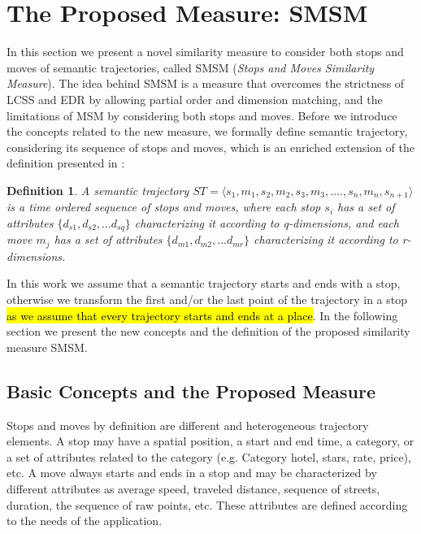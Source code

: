 \documentclass[12pt]{article}
\newtheorem{definition}{Definition}
\begin{document}


\section{The Proposed Measure: SMSM} \label{sec:proposed_measure}
In this section we present a novel similarity measure to consider both stops and moves of semantic trajectories, called SMSM (\textit{Stops and Moves Similarity Measure}). The idea behind SMSM is a measure that overcomes the strictness of LCSS and EDR by allowing partial order and dimension matching, and the limitations of MSM by considering both stops and moves. Before we introduce the concepts related to the new measure, we formally define semantic trajectory, considering its sequence of stops and moves, which is an enriched extension of the definition presented in \cite{Spaccapietra:2008:CVT:1347466.1347785}:


\begin{definition}
\label{def:semantic_trajectory}
A semantic trajectory  $ST=\langle s_1, m_1, s_2, m_2, s_3,m_3, ...., s_n, m_n, s_{n+1} \rangle$ is a time ordered sequence of stops and moves, where each stop $s_i$ has a set of attributes $\{d_{s1}, d_{s2}, ...d_{sq}\}$ characterizing it according to q-dimensions, and each move $m_j$  has a set of attributes $\{d_{m1}, d_{m2}, ...d_{mr}\}$  characterizing it according to r-dimensions. 
\end{definition}

In this work we assume that a semantic trajectory starts and ends with a stop, otherwise we transform the first and/or the last point of the trajectory in a stop \hl{as we assume that every trajectory starts and ends at a place}. In the following section we present the new concepts and the definition of the proposed similarity measure SMSM.

\subsection{Basic Concepts and the Proposed Measure}

Stops and moves by definition are different and heterogeneous trajectory elements. A stop may have a spatial position, a start and end time, a category, or a set of attributes related to the category (e.g. Category hotel, stars, rate, price), etc. A move always starts and ends in a stop and may be characterized by different attributes as average speed, traveled distance, sequence of streets, duration, the sequence of raw points, etc. These attributes are defined according to the needs of the application. 
\end{document}
